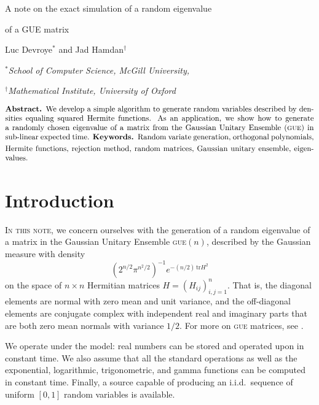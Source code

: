 \documentclass[10pt]{article}
\def\maketitlefull#1#2#3#4#5{
  \centerline {\bigbold #1}
  \medskip
  \centerline {\bigbold #2}
  \medskip
  \centerline {\tensc #3}
  \medskip
  \centerline {\sl #4}
\centerline {\sl #5}
  \bigskip
}
\theoremstyle{definition}
\theoremstyle{remark}
\newcommand{\1}{\mathbbm{1}}
\newcommand{\0}{\mathbbm{0}}
\newcommand{\no}{\noindent}
\begin{document}
\maketitlefull{A note on the exact simulation of a random eigenvalue}{of a GUE matrix}{Luc Devroye$^*$ and Jad Hamdan$^\dag$}{$^*$School of Computer Science, McGill University,\,\,}{$^\dag$Mathematical Institute, University of Oxford}
\medskip

\[
  \vbox{
    \hsize 5.5 true in
    \noindent{\bf Abstract.}\enskip 
        We develop a simple algorithm to generate random variables described by densities equaling squared Hermite functions. As an application, we show how to generate a randomly chosen eigenvalue of a matrix from the Gaussian Unitary Ensemble ({\textsc{gue}}) in sub-linear expected time.
    \smallskip 
    
    \noindent{\bf Keywords.}\enskip Random variate generation, orthogonal polynomials, Hermite functions, rejection method, random matrices, Gaussian unitary ensemble, eigenvalues.
    
  }
\] 

\smallskip

\section{Introduction} \label{sec:intro}
\no 

\textsc{In this note,} we concern ourselves with the generation of a random eigenvalue of a matrix in the Gaussian Unitary Ensemble {\textsc{gue}}$(n)$, described by the Gaussian measure with density
\[
    (2^{n/2}\pi^{n^2/2})^{-1}e^{-(n/2) \, \text{tr} H^2}
\]
on the space of $n\times n$ Hermitian matrices $H=(H_{ij})_{i,j=1}^n$. That is, the diagonal elements are normal with zero mean and unit variance, and the off-diagonal elements are conjugate complex with independent real and imaginary parts that are both zero mean normals with variance $1/2$. For more on {\textsc{gue}} matrices, see \cite{guionnet, deift}.

We operate under the {} model: real numbers can be stored and operated upon in constant time. We also assume that all the standard operations as well as the exponential, logarithmic, trigonometric, and gamma functions can be computed in constant time. Finally, a source capable of producing an i.i.d.\ sequence of uniform $[0, 1]$ random variables is available.
\end{document}
